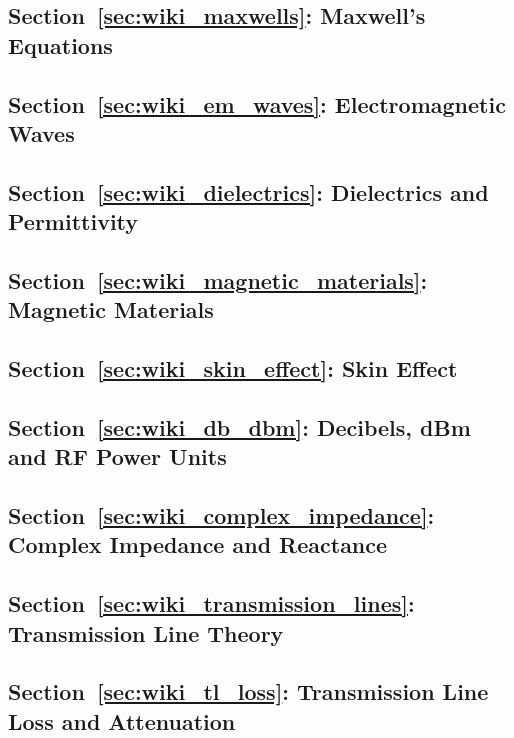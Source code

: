\subsection*{Section~\ref{sec:wiki_maxwells}: Maxwell's Equations}

\subsection*{Section~\ref{sec:wiki_em_waves}: Electromagnetic Waves}

\subsection*{Section~\ref{sec:wiki_dielectrics}: Dielectrics and Permittivity}

\subsection*{Section~\ref{sec:wiki_magnetic_materials}: Magnetic Materials}

\subsection*{Section~\ref{sec:wiki_skin_effect}: Skin Effect}

\subsection*{Section~\ref{sec:wiki_db_dbm}: Decibels, dBm and RF Power Units}

\subsection*{Section~\ref{sec:wiki_complex_impedance}: Complex Impedance and Reactance}

\subsection*{Section~\ref{sec:wiki_transmission_lines}: Transmission Line Theory}

\subsection*{Section~\ref{sec:wiki_tl_loss}: Transmission Line Loss and Attenuation}
